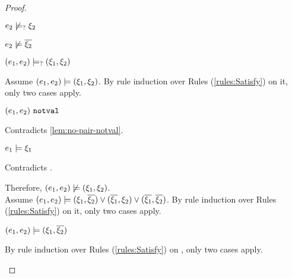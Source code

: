 \begin{proof}
\begin{byCases}
\begin{byCases}
\begin{byCases}
\begin{pfsteps*}
            \item $e_2 \not\models_{?} \xi_2$  
            \item $e_2 \not\models \overline{\xi_2}$  
            \item $(e_1 , e_2) \models_{?} (\xi_1 , \xi_2)$ 
            \end{pfsteps*}
            Assume $(e_1 , e_2) \models (\xi_1 , \xi_2)$. By rule induction over Rules (\ref{rules:Satisfy}) on it, only two cases apply. 
           \begin{byCases}
            \item[\text{(\ref{rule:CSNotValPair})}]
                \begin{pfsteps*}
                \item $(e_1 , e_2) ~\mathtt{notval}$ 
                \end{pfsteps*}
                Contradicts \autoref{lem:no-pair-notval}.
            \item[\text{(\ref{rule:CSPair})}]
                \begin{pfsteps*}
                \item $e_1 \models \xi_1$ 
                \end{pfsteps*}
                Contradicts .
            \end{byCases}
            Therefore, $(e_1 , e_2) \not\models (\xi_1 , \xi_2)$. \\
            Assume $(e_1 , e_2) \models (\xi_1 , \overline{\xi_2}) \vee (\overline{\xi_1} , \xi_2) \vee (\overline{\xi_1} , \overline{\xi_2})$. By rule induction over Rules (\ref{rules:Satisfy}) on it, only two cases apply.
            \begin{byCases}
            \item[\text{(\ref{rule:CSOr1})}]
                \begin{pfsteps*}
                \item $(e_1 , e_2) \models (\xi_1 , \overline{\xi_2})$  
                \end{pfsteps*}
                By rule induction over Rules (\ref{rules:Satisfy}) on , only two cases apply.

\end{byCases}
\end{byCases}
\end{byCases}
\end{byCases}
\end{proof}
